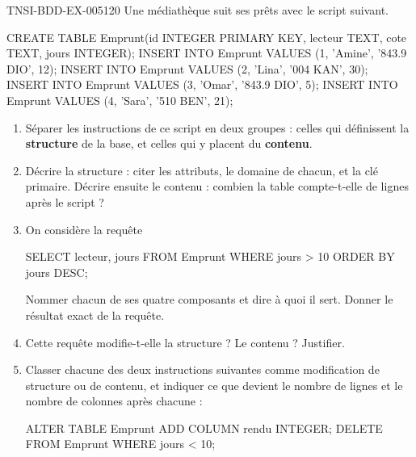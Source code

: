 \begin{exercice}{TNSI-BDD-EX-005}{1}{20}
Une médiathèque suit ses prêts avec le script suivant.
\begin{sql}
CREATE TABLE Emprunt(id INTEGER PRIMARY KEY, lecteur TEXT, cote TEXT, jours INTEGER);
INSERT INTO Emprunt VALUES (1, 'Amine', '843.9 DIO', 12);
INSERT INTO Emprunt VALUES (2, 'Lina', '004 KAN', 30);
INSERT INTO Emprunt VALUES (3, 'Omar', '843.9 DIO', 5);
INSERT INTO Emprunt VALUES (4, 'Sara', '510 BEN', 21);
\end{sql}
\begin{enumerate}
  \item Séparer les instructions de ce script en deux groupes : celles qui
    définissent la \textbf{structure} de la base, et celles qui y placent du
    \textbf{contenu}.
  \item Décrire la structure : citer les attributs, le domaine de chacun, et la
    clé primaire. Décrire ensuite le contenu : combien la table compte-t-elle de
    lignes après le script ?
  \item On considère la requête
    \begin{sql}
SELECT lecteur, jours FROM Emprunt WHERE jours > 10 ORDER BY jours DESC;
    \end{sql}
    Nommer chacun de ses quatre composants et dire à quoi il sert. Donner le
    résultat exact de la requête.
  \item Cette requête modifie-t-elle la structure ? Le contenu ? Justifier.
  \item Classer chacune des deux instructions suivantes comme modification de
    structure ou de contenu, et indiquer ce que devient le nombre de lignes et
    le nombre de colonnes après chacune :
    \begin{sql}
ALTER TABLE Emprunt ADD COLUMN rendu INTEGER;
DELETE FROM Emprunt WHERE jours < 10;
    \end{sql}
\end{enumerate}
\end{exercice}
